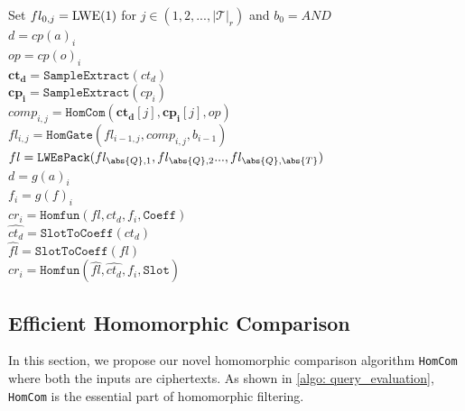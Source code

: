 \begin{algorithm}[htbp]
    \caption{Homomorphic Query Evaluation \texttt{HomQuery}}
    \label{algo: query_evaluation}
     Set $fl_{0,j} = {\rm LWE}(1)$ 
     for $j \in (1,2,...,\lvert \mathcal{T} \rvert_{r})$ and $b_0 = AND$\\
    {
        $d = cp(a)_i$  \\
        $op = cp(o)_i$  \\
        $\mathbf{ct_d} = \texttt{SampleExtract}(ct_{d})$ 
        \\
        $\mathbf{cp_i} = \texttt{SampleExtract}(cp_{i})$ \\
        {
            $comp_{i,j} = \texttt{HomCom}
            (\mathbf{ct_d}[j], \mathbf{cp_i}[j],op)$ \\
            $fl_{i,j} = \texttt{HomGate}(fl_{i-1, j}, comp_{i,j}, b_{i-1})$ \\
        }
    }
    $fl = \texttt{LWEsPack}(fl_{\abs{Q}, 1},fl_{\abs{Q}, 2}...,fl_{\abs{Q}, \abs{T}})$  \\
    {
        $d = g(a)_i$ \\
        $f_i = g(f)_i$ \\
        {
            $cr_i = \texttt{Homfun}(fl, ct_d, f_i, \texttt{Coeff})$ \\
        }
        {
            $\hat{ct_d} = \texttt{SlotToCoeff}(ct_d)$ \\
            $\hat{fl} = \texttt{SlotToCoeff}(fl)$ \\
            $cr_i = \texttt{Homfun}(\hat{fl}, \hat{ct_d}, f_i, \texttt{Slot})$ \\
        }
    }
\end{algorithm}

\subsection{Efficient Homomorphic Comparison}
In this section, we propose our novel homomorphic comparison algorithm
\texttt{HomCom} where both the inputs are ciphertexts.
As shown in \cref{algo: query_evaluation}, \texttt{HomCom}
is the essential part of homomorphic filtering.

